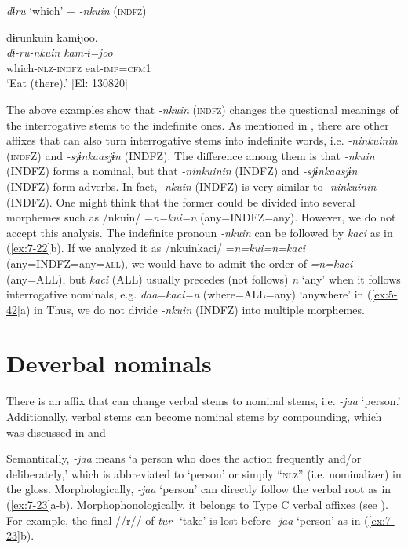 \ex \label{ex:7:22e} \textit{dɨru} ‘which’ + \textit{{}-nkuin} (\textsc{indfz})

{\TM}
\glll  dɨrunkuin  kamɨjoo.\\
\textit{dɨ-ru-nkuin}  \textit{kam-ɨ=joo}\\
which-\textsc{nlz}-\textsc{indfz}  eat-\textsc{imp}=\textsc{cfm}1\\
\glt ‘Eat  (there).’ [El: 130820]

\z
\z

The above examples show that \textit{{}-nkuin} (\textsc{indfz}) changes the questional meanings of the interrogative stems to the indefinite ones. As mentioned in , there are other affixes that can also turn interrogative stems into indefinite words, i.e. \textit{{}-ninkuinin} (\textsc{indf}Z) and \textit{{}-sjɨnkaasjɨn} (INDFZ). The difference among them is that \textit{{}-nkuin} (INDFZ) forms a nominal, but that \textit{{}-ninkuinin} (INDFZ) and \textit{{}-sjɨnkaasjɨn} (INDFZ) form adverbs. In fact, \textit{{}-nkuin} (INDFZ) is very similar to \textit{{}-ninkuinin} (INDFZ). One might think that the former could be divided into several morphemes such as /nkuin/ =\textit{n=kui=n} (any=INDFZ=any). However, we do not accept this analysis. The indefinite pronoun \textit{{}-nkuin} can be followed by \textit{kaci} as in (\ref{ex:7-22}b). If we analyzed it as /nkuinkaci/ =\textit{n=kui=n=kaci} (any=INDFZ=any=\textsc{all}), we would have to admit the order of \textit{=n=kaci} (any=ALL), but \textit{kaci} (ALL) usually precedes (not follows) \textit{n} ‘any’ when it follows interrogative nominals, e.g. \textit{daa=kaci=n} (where=ALL=any) ‘anywhere’ in (\ref{ex:5-42}a) in  Thus, we do not divide \textit{{}-nkuin} (INDFZ) into multiple morphemes.

\section{Deverbal nominals}

There is an affix that can change verbal stems to nominal stems, i.e. \textit{{}-jaa} ‘person.’ Additionally, verbal stems can become nominal stems by compounding, which was discussed in  and 

Semantically, \textit{{}-jaa} means ‘a person who does the action frequently and/or deliberately,’ which is abbreviated to ‘person’ or simply “\textsc{nlz}” (i.e. nominalizer) in the gloss. Morphologically, \textit{-jaa} ‘person’ can directly follow the verbal root as in (\ref{ex:7-23}a-b). Morphophonologically, it belongs to Type C verbal affixes (see ). For example, the final //r// of \textit{tur-} ‘take’ is lost before \textit{{}-jaa} ‘person’ as in (\ref{ex:7-23}b).

